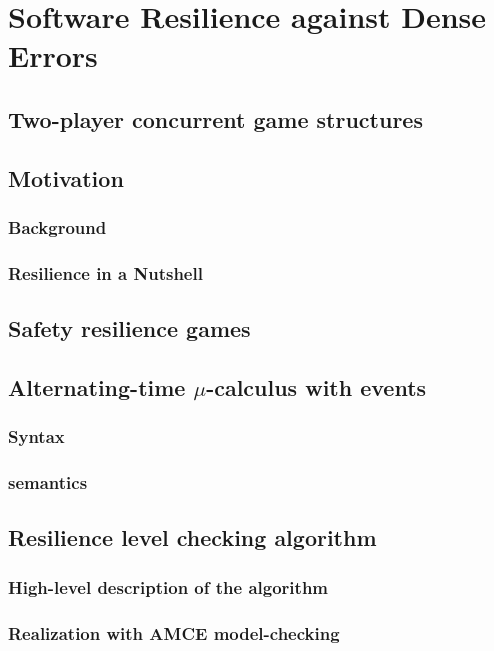 \chapter{Software Resilience against Dense Errors}
\label{c:resilience}

\section{Two-player concurrent game structures}

\section{Motivation}
\subsection{Background}
\subsection{Resilience in a Nutshell}

\section{Safety resilience games}

\section{Alternating-time $\mu$-calculus with events}
\subsection{Syntax}
\subsection{semantics}

\section{Resilience level checking algorithm}
\subsection{High-level description of the algorithm}
\subsection{Realization with AMCE model-checking}
